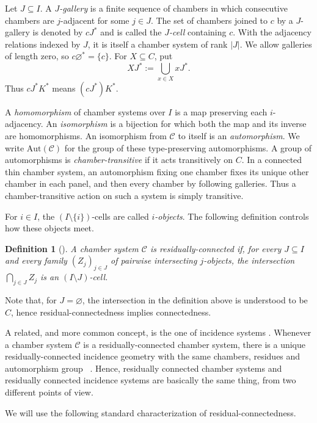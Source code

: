 \documentclass[10pt,a4paper]{amsart}
\newtheorem{definition}[prop]{Definition}
\newcommand{\CC}{\mathcal{C}}
\newcommand{\Aut}{\mathrm{Aut}}
\begin{document}
Let $J\subseteq I$.  A \emph{$J$-gallery} is a finite sequence of chambers
in which consecutive chambers are $j$-adjacent for some $j\in J$.  The set
of chambers joined to $c$ by a $J$-gallery is denoted by $cJ^*$ and is called
the \emph{$J$-cell} containing $c$.  With the adjacency relations indexed by
$J$, it is itself a chamber system of rank $|J|$.  We allow galleries of
length zero, so $c\varnothing^*=\{c\}$.  For $X\subseteq C$, put
\[
    XJ^*:=\bigcup_{x\in X}xJ^*.
\]
Thus $cJ^*K^*$ means $(cJ^*)K^*$.


A \emph{homomorphism} of chamber systems over $I$ is a map preserving each
$i$-adjacency.  An \emph{isomorphism} is a bijection for which both the map
and its inverse are homomorphisms.  An isomorphism from $\CC$ to itself is
an \emph{automorphism}. We write $\Aut(\CC)$ for the group of these
type-preserving automorphisms.  A group of automorphisms is
\emph{chamber-transitive} if it acts transitively on $C$.  In a connected
thin chamber system, an automorphism fixing one chamber fixes its unique
other chamber in each panel, and then every chamber by following
galleries.  Thus a chamber-transitive action on such a system is simply
transitive.

For $i\in I$, the $(I\setminus\{i\})$-cells are called \emph{$i$-objects}.
The following definition controls how these objects meet.

\begin{definition}[{\cite[Section~3.4]{buekenhout2013diagram}}]
A chamber system $\CC$ is \emph{residually-connected} if, for every
$J\subseteq I$ and every family $(Z_j)_{j\in J}$ of pairwise intersecting
$j$-objects, the intersection $\bigcap_{j\in J}Z_j$ is an
$(I\setminus J)$-cell.
\end{definition}
Note that, for $J=\varnothing$, the intersection in the definition above is understood
to be $C$, hence residual-connectedness implies connectedness.

A related, and more common concept, is the one of incidence systems \cite[Chapter 1]{buekenhout2013diagram}. Whenever a chamber system
$\CC$ is a residually-connected chamber system, there is a unique residually-connected
incidence geometry with the same chambers, residues and automorphism group
~\cite{buekenhout2013diagram}. Hence, residually connected chamber systems and residually connected incidence systems are basically the same thing, from two different points of view.

We will use the following standard characterization of residual-connectedness.
\end{document}

